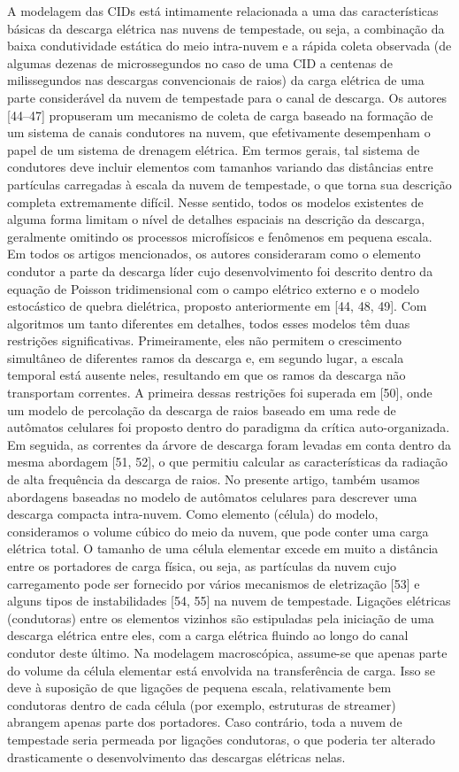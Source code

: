 \documentclass[a4paper, 12pt, onecolumn,singlespacing]{article}
\begin{document}
	A modelagem das CIDs está intimamente relacionada a uma das características básicas da descarga elétrica nas nuvens de tempestade, ou seja, a combinação da baixa condutividade estática do meio intra-nuvem e a rápida coleta observada (de algumas dezenas de microssegundos no caso de uma CID a centenas de milissegundos nas descargas convencionais de raios) da carga elétrica de uma parte considerável da nuvem de tempestade para o canal de descarga. Os autores [44–47] propuseram um mecanismo de coleta de carga baseado na formação de um sistema de canais condutores na nuvem, que efetivamente desempenham o papel de um sistema de drenagem elétrica. Em termos gerais, tal sistema de condutores deve incluir elementos com tamanhos variando das distâncias entre partículas carregadas à escala da nuvem de tempestade, o que torna sua descrição completa extremamente difícil. Nesse sentido, todos os modelos existentes de alguma forma limitam o nível de detalhes espaciais na descrição da descarga, geralmente omitindo os processos microfísicos e fenômenos em pequena escala. Em todos os artigos mencionados, os autores consideraram como o elemento condutor a parte da descarga líder cujo desenvolvimento foi descrito dentro da equação de Poisson tridimensional com o campo elétrico externo e o modelo estocástico de quebra dielétrica, proposto anteriormente em [44, 48, 49]. Com algoritmos um tanto diferentes em detalhes, todos esses modelos têm duas restrições significativas. Primeiramente, eles não permitem o crescimento simultâneo de diferentes ramos da descarga e, em segundo lugar, a escala temporal está ausente neles, resultando em que os ramos da descarga não transportam correntes. A primeira dessas restrições foi superada em [50], onde um modelo de percolação da descarga de raios baseado em uma rede de autômatos celulares foi proposto dentro do paradigma da crítica auto-organizada. Em seguida, as correntes da árvore de descarga foram levadas em conta dentro da mesma abordagem [51, 52], o que permitiu calcular as características da radiação de alta frequência da descarga de raios. No presente artigo, também usamos abordagens baseadas no modelo de autômatos celulares para descrever uma descarga compacta intra-nuvem. Como elemento (célula) do modelo, consideramos o volume cúbico do meio da nuvem, que pode conter uma carga elétrica total. O tamanho de uma célula elementar excede em muito a distância entre os portadores de carga física, ou seja, as partículas da nuvem cujo carregamento pode ser fornecido por vários mecanismos de eletrização [53] e alguns tipos de instabilidades [54, 55] na nuvem de tempestade. Ligações elétricas (condutoras) entre os elementos vizinhos são estipuladas pela iniciação de uma descarga elétrica entre eles, com a carga elétrica fluindo ao longo do canal condutor deste último. Na modelagem macroscópica, assume-se que apenas parte do volume da célula elementar está envolvida na transferência de carga. Isso se deve à suposição de que ligações de pequena escala, relativamente bem condutoras dentro de cada célula (por exemplo, estruturas de streamer) abrangem apenas parte dos portadores. Caso contrário, toda a nuvem de tempestade seria permeada por ligações condutoras, o que poderia ter alterado drasticamente o desenvolvimento das descargas elétricas nelas.
	
\end{document}
